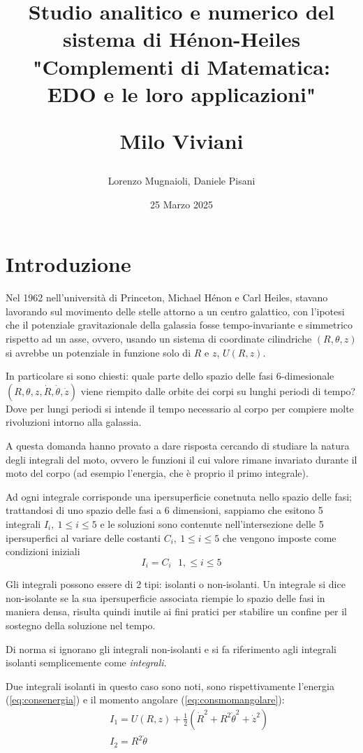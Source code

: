 \documentclass[a4paper]{article}
\title{
	Studio analitico e numerico del sistema di Hénon-Heiles\\
	\vspace{1cm}	
	"Complementi di Matematica: EDO e le loro applicazioni"\\
	\begin{large}
		Milo Viviani
	\end{large}
	\vspace{1cm}

}
\date{25 Marzo 2025}
\author{Lorenzo Mugnaioli, Daniele Pisani}
\numberwithin{equation}{section}
\numberwithin{figure}{section}
\begin{document}
\maketitle
\clearpage
\tableofcontents
\clearpage

\section{Introduzione}
Nel 1962 nell'università di Princeton, Michael Hénon e  Carl Heiles,
stavano lavorando sul movimento delle stelle attorno a un centro galattico,
con l'ipotesi che il potenziale gravitazionale della galassia fosse tempo-invariante e simmetrico
rispetto ad un asse, ovvero, usando un sistema di coordinate cilindriche $(R,\theta,z)$ si avrebbe 
un potenziale in funzione solo di $R$ e $z$, $U(R,z)$.

In particolare si sono chiesti:
quale parte dello spazio delle fasi 6-dimesionale $(R,\theta,z, \dot{R},\dot{\theta}, \dot{z})$
viene riempito dalle orbite dei corpi su lunghi periodi di tempo? \cite{1964henonheiles}
Dove per lungi periodi si intende il tempo necessario al corpo per compiere molte rivoluzioni
intorno alla galassia.

A questa domanda hanno provato a dare risposta cercando di studiare la natura degli integrali del moto,
ovvero le funzioni il cui valore rimane invariato durante il moto del corpo (ad esempio l'energia,
che è proprio il primo integrale).

Ad ogni integrale corrisponde una ipersuperficie conetnuta nello spazio delle fasi; trattandosi di uno spazio
delle fasi a 6 dimensioni, sappiamo che esitono 5 integrali $I_i,\ 1\le i\le 5$ e le soluzioni
sono contenute nell'intersezione delle 5 ipersuperfici al variare delle costanti
$C_i,\ 1\le i\le 5$ che vengono imposte come condizioni iniziali
\begin{equation}
	I_i = C_i\ \ \  1,\le i\le 5
\end{equation}

Gli integrali possono essere di 2 tipi: isolanti o non-isolanti. Un integrale si dice non-isolante
se la sua ipersuperficie associata riempie lo spazio delle fasi in maniera densa, risulta quindi inutile
ai fini pratici per stabilire un confine per il sostegno della soluzione nel tempo.

Di norma si ignorano gli integrali non-isolanti e si fa riferimento agli integrali isolanti semplicemente
come \textit{integrali}.

Due integrali isolanti in questo caso sono noti, sono rispettivamente l'energia (\ref{eq:consenergia})
e il momento angolare (\ref{eq:consmomangolare}):
\begin{eqnarray}
	&&I_1 = U(R,z) + \frac{1}{2}(\dot{R}^2+R^2\dot{\theta}^2+\dot{z}^2) \label{eq:consenergia}\\
	&&I_2 = R^2\dot{\theta} \label{eq:consmomangolare}
\end{eqnarray}
\end{document}
